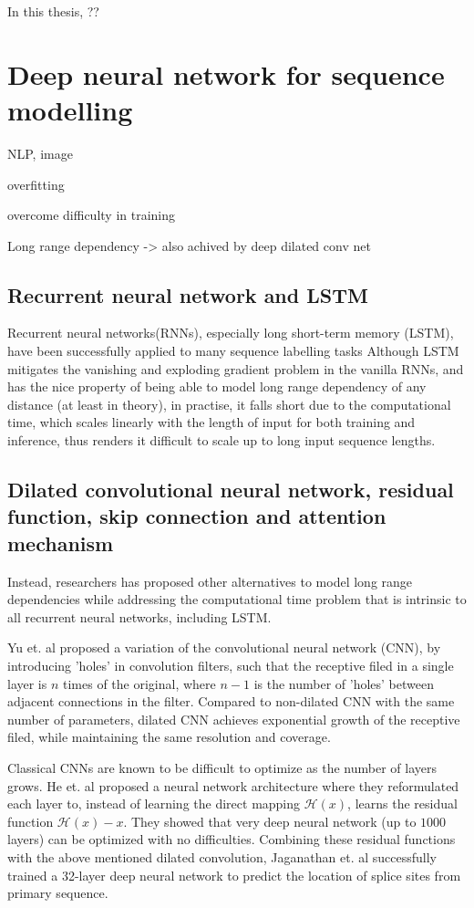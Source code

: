 \documentclass{proposal}
\begin{document}
In this thesis, ??


\section{Deep neural network for sequence modelling}

NLP, image

overfitting

overcome difficulty in training

Long range dependency -> also achived by deep  dilated conv net

\subsection*{Recurrent neural network and LSTM}

Recurrent neural networks(RNNs), especially long short-term memory (LSTM)\cite{hochreiter1997long},
have been successfully applied to many sequence labelling tasks
Although LSTM mitigates the vanishing and exploding gradient problem in the vanilla RNNs,
and has the nice property of being able to model long range dependency of any distance (at least in theory),
in practise, it falls short due to the computational time,
which scales linearly with the length of input for both training and inference,
thus renders it difficult to scale up to long input sequence lengths.

\subsection*{Dilated convolutional neural network, residual function, skip connection and attention mechanism}

Instead, researchers has proposed other alternatives to model long range dependencies while addressing the
computational time problem that is intrinsic to all recurrent neural networks, including LSTM.

Yu et. al\cite{yu2015multi} proposed a variation of the convolutional neural network (CNN),
by introducing 'holes' in convolution filters, such that the receptive filed in a single layer is $n$ times of the original,
where $n-1$ is the number of 'holes' between adjacent connections in the filter.
Compared to non-dilated CNN with the same number of parameters,
dilated CNN achieves exponential growth of the receptive filed,
while maintaining the same resolution and coverage.

Classical CNNs are known to be difficult to optimize as the number of layers grows.
He et. al\cite{he2016deep} proposed a neural network architecture where they reformulated
each layer to, instead of learning the direct mapping $\mathcal{H}(x)$,
learns the residual function $\mathcal{H}(x) - x$.
They showed that very deep neural network (up to $1000$ layers) can be optimized with no difficulties.
Combining these residual functions with the above mentioned dilated convolution,
Jaganathan et. al\cite{jaganathan2019predicting} successfully trained a 32-layer deep neural network to predict
the location of splice sites from primary sequence.
\end{document}
